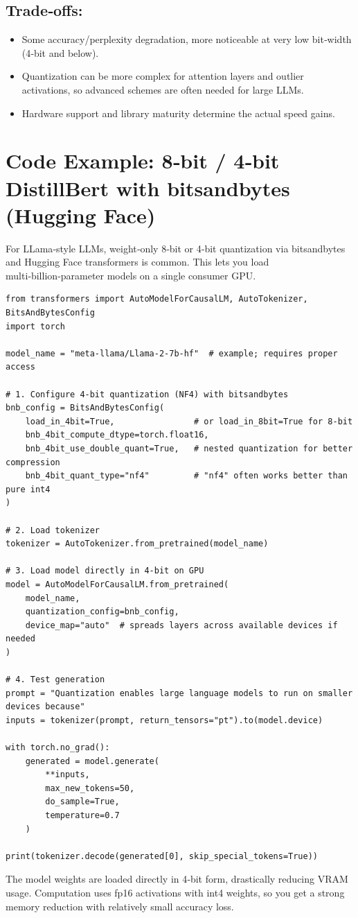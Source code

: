 \documentclass{article}
\begin{document}
\subsection{Trade‑offs:}

\begin{itemize}
    \item Some accuracy/perplexity degradation, more noticeable at very low bit‑width (4‑bit and below).
    \item Quantization can be more complex for attention layers and outlier activations, so advanced schemes are often needed for large LLMs.
    \item Hardware support and library maturity determine the actual speed gains.
\end{itemize} 


\section{Code Example: 8‑bit / 4‑bit DistillBert with bitsandbytes (Hugging Face)}

\normalsize{For LLama‑style LLMs, weight‑only 8‑bit or 4‑bit quantization via bitsandbytes and Hugging Face transformers is common.
This lets you load multi‑billion‑parameter models on a single consumer GPU.}

\begin{lstlisting}[caption={Finetuning DistillBERT with LoRA}, label={code:python_quantize}]
from transformers import AutoModelForCausalLM, AutoTokenizer, BitsAndBytesConfig
import torch

model_name = "meta-llama/Llama-2-7b-hf"  # example; requires proper access

# 1. Configure 4-bit quantization (NF4) with bitsandbytes
bnb_config = BitsAndBytesConfig(
    load_in_4bit=True,                # or load_in_8bit=True for 8-bit
    bnb_4bit_compute_dtype=torch.float16,
    bnb_4bit_use_double_quant=True,   # nested quantization for better compression
    bnb_4bit_quant_type="nf4"         # "nf4" often works better than pure int4
)

# 2. Load tokenizer
tokenizer = AutoTokenizer.from_pretrained(model_name)

# 3. Load model directly in 4-bit on GPU
model = AutoModelForCausalLM.from_pretrained(
    model_name,
    quantization_config=bnb_config,
    device_map="auto"  # spreads layers across available devices if needed
)

# 4. Test generation
prompt = "Quantization enables large language models to run on smaller devices because"
inputs = tokenizer(prompt, return_tensors="pt").to(model.device)

with torch.no_grad():
    generated = model.generate(
        **inputs,
        max_new_tokens=50,
        do_sample=True,
        temperature=0.7
    )

print(tokenizer.decode(generated[0], skip_special_tokens=True))

\end{lstlisting}

\normalsize{The model weights are loaded directly in 4‑bit form, drastically reducing VRAM usage.
Computation uses fp16 activations with int4 weights, so you get a strong memory reduction with relatively small accuracy loss.
}
\end{document}

